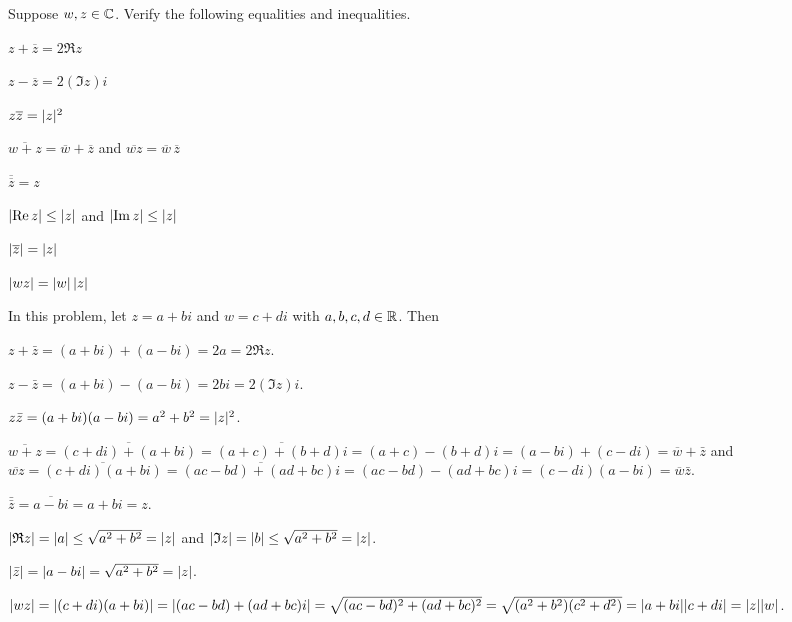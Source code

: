 
\begin{exercise}
Suppose $w,z\in\mathbb{C}$. Verify the following equalities and inequalities.
\begin{parts}
\item $z+\overline{z}=2\Re z$
\item $z-\overline{z}=2(\Im z)i$
\item $z\overline{z}=\lvert z \rvert^2$
\item $\overline{w+z}=\overline{w}+\overline{z}$ and
  $\overline{wz}=\overline{w}\,\overline{z}$
\item $\overline{\overline{z}}=z$
\item $\lvert \operatorname{Re} z \rvert\le\lvert z \rvert$ and $\lvert \operatorname{Im} z \rvert\le\lvert z \rvert$
\item $\lvert \overline{z} \rvert=\lvert z \rvert$
\item $\lvert wz \rvert=\lvert w \rvert\,\lvert z \rvert$
\end{parts}
\end{exercise}
\begin{solution}
In this problem, let $z=a+bi$ and $w=c+di$ with $a,b,c,d\in\mathbb{R}$. Then
\begin{parts}
\item $z+\bar{z}=(a+bi)+(a-bi)=2a=2\mathfrak{R}z$.
\item $z-\bar{z}=(a+bi)-(a-bi)=2bi=2(\mathfrak{I}z)i$.
\item $z\bar{z}=(a+bi)(a-bi)=a^2+b^2=\lvert z \rvert^2$.
\item $\overline{w+z}=\overline{(c+di)+(a+bi)}=\overline{(a+c)+(b+d)i}
  =(a+c)-(b+d)i=(a-bi)+(c-di)=\overline{w}+\bar{z}$ and
  $\overline{wz}=\overline{(c+di)(a+bi)}=\overline{(ac-bd)+(ad+bc)i}
  =(ac-bd)-(ad+bc)i=(c-di)(a-bi)=\overline{w}\bar{z}$.
\item $\bar{\bar{z}}=\overline{a-bi}=a+bi=z$.
\item $\lvert \mathfrak{R}z \rvert=\lvert a \rvert\le\sqrt{a^2+b^2}=\lvert z \rvert$ and
  $\lvert \mathfrak{I}z \rvert=\lvert b \rvert\le\sqrt{a^2+b^2}=\lvert z \rvert$.
\item $\lvert \bar{z} \rvert=\lvert a-bi \rvert=\sqrt{a^2+b^2}=\lvert z \rvert$.
\item $\lvert wz \rvert=\lvert (c+di)(a+bi) \rvert=\lvert (ac-bd)+(ad+bc)i \rvert
  =\sqrt{(ac-bd)^2+(ad+bc)^2}=\sqrt{(a^2+b^2)(c^2+d^2)}
  =\lvert a+bi \rvert\lvert c+di \rvert=\lvert z \rvert\lvert w \rvert$. \qedhere
\end{parts}
\end{solution}


